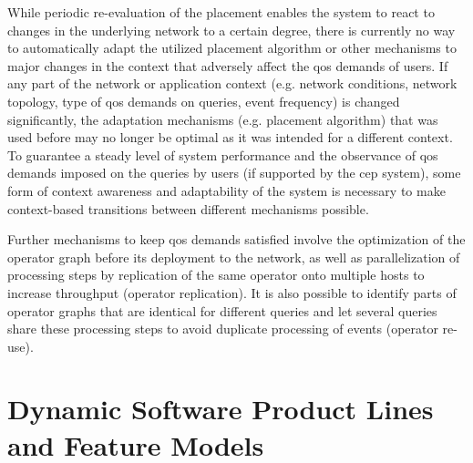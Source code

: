 While periodic re-evaluation of the placement enables the system to react to changes in the underlying network to a certain degree, there is currently no way to automatically adapt the utilized placement algorithm or other mechanisms to major changes in the context that adversely affect the \gls{qos} demands of users. If any part of the network or application context (e.g. network conditions, network topology, type of \gls{qos} demands on queries, event frequency) is changed significantly, the adaptation mechanisms (e.g. placement algorithm) that was used before may no longer be optimal as it was intended for a different context. To guarantee a steady level of system performance and the observance of \gls{qos} demands imposed on the queries by users (if supported by the \gls{cep} system), some form of context awareness and adaptability of the system is necessary to make context-based transitions between different mechanisms possible.

Further mechanisms to keep \gls{qos} demands satisfied involve the optimization of the operator graph before its deployment to the network, as well as parallelization of processing steps by replication of the same operator onto multiple hosts to increase throughput (operator replication). It is also possible to identify parts of operator graphs that are identical for different queries and let several queries share these processing steps to avoid duplicate processing of events (operator re-use).

\section{Dynamic Software Product Lines and Feature Models}

